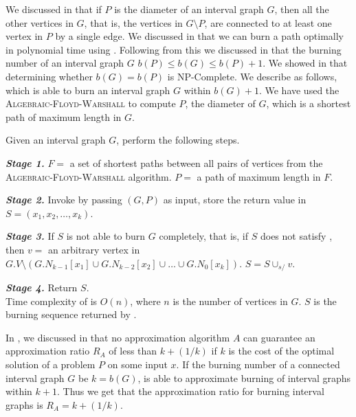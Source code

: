We discussed in  that if $P$ is the diameter of an interval graph $G$, then all the other vertices in $G$, that is, the vertices in $G\setminus P$, are connected to at least one vertex in $P$ by a single edge.
We discussed in  that we can burn a path optimally in polynomial time using . Following from this we discussed in  that the burning number of an interval graph $G$ $b(P)\leq b(G)\leq b(P)+1$. We showed in  that determining whether $b(G)=b(P)$ is NP-Complete. We describe  as follows, which is able to burn an interval graph $G$ within $b(G)+1$. We have used the \textsc{Algebraic-Floyd-Warshall} \cite{Kepner2011} to compute $P$, the diameter of $G$, which is a shortest path of maximum length in $G$.

\begin{algorithm}\label{algorithm:approximate-burn-IG}
    Given an interval graph $G$, perform the following steps.
\end{algorithm}

\textbf{\textit{Stage 1.}} $F=$ a set of shortest paths between all pairs of vertices from the \textsc{Algebraic-Floyd-Warshall} algorithm. $P=$ a path of maximum length in $F$.

\textbf{\textit{Stage 2.}} Invoke  by passing $(G, P)$ as input, store the return value in $S=(x_1,x_2,\dots,x_k)$.

\textbf{\textit{Stage 3.}} If $S$ is not able to burn $G$ completely, that is, if $S$ does not satisfy , then $v=$ an arbitrary vertex in $G.V\setminus (G.N_{k-1}[x_1]\cup G.N_{k-2}[x_2]\cup\dots\cup G.N_0[x_k])$. $S=S\cup_{s/}v$.

\textbf{\textit{Stage 4.}} Return $S$.\\

Time complexity of  is $O(n)$, where $n$ is the number of vertices in $G$. $S$ is the burning sequence returned by .

In , we discussed in  that no approximation algorithm $A$ can guarantee an approximation ratio $R_A$ of less than $k+(1/k)$ if $k$ is the cost of the optimal solution of a problem $P$ on some input $x$. If the burning number of a connected interval graph $G$ be $k=b(G)$,  is able to approximate burning of interval graphs within $k+1$. Thus we get that the approximation ratio for burning interval graphs is $R_A=k+(1/k)$.

% 
% 